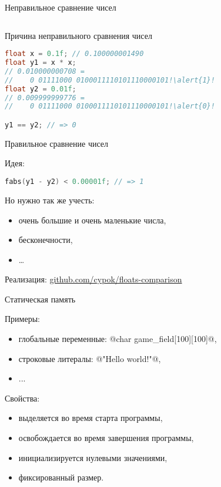 \begin{backup}
\begin{frame}[fragile]{Неправильное сравнение чисел}
\begin{columns}[onlytextwidth,c]
  \end{columns}

\end{frame}

\begin{frame}[fragile]{Причина неправильного сравнения чисел}

  \begin{lstlisting}[language=C,escapechar=\!]
float x = 0.1f; // 0.100000001490
float y1 = x * x;
// 0.010000000708 =
//    0 01111000 0100011110101110000101!\alert{1}!
float y2 = 0.01f;
// 0.009999999776 =
//    0 01111000 0100011110101110000101!\alert{0}!

y1 == y2; // => 0
  \end{lstlisting}

\end{frame}

\begin{frame}[fragile]{Правильное сравнение чисел}

  Идея:
  \begin{lstlisting}[language=C]
fabs(y1 - y2) < 0.00001f; // => 1
  \end{lstlisting}

  \pause

  Но нужно так же учесть:
  \begin{itemize}
    \item очень большие и очень маленькие числа,
    \item бесконечности,
    \item \ldots
  \end{itemize}

  Реализация: \href{%
    https://github.com/cypok/floats-comparison%
  }{%
    github.com/cypok/floats-comparison
  }

\end{frame}


\begin{frame}[fragile]{Статическая память}

  Примеры:
  \begin{itemize}
    \item глобальные переменные: @char game_field[100][100]@,
    \item строковые литералы: @"Hello world!"@,
    \item ...
  \end{itemize}

  \pause
  Свойства:
  \begin{itemize}
    \item выделяется во время старта программы,
    \item освобождается во время завершения программы,
    \item инициализируется нулевыми значениями,
    \item фиксированный размер.
  \end{itemize}


\end{frame}
\end{backup}
